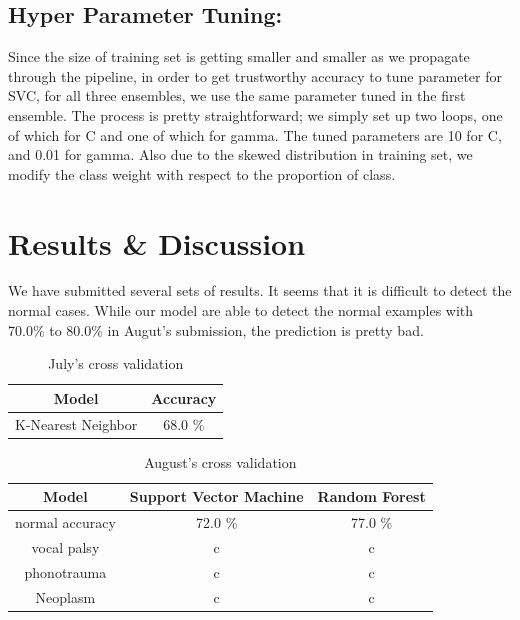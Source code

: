 \documentclass[conference]{IEEEtran}
\begin{document}
	\subsection{Hyper Parameter Tuning:}
		Since the size of training set is getting smaller and smaller as we propagate through the pipeline, in order to get trustworthy accuracy to tune parameter for SVC, for all three ensembles, we use the same parameter tuned in the first ensemble. The process is pretty straightforward; we simply set up two loops, one of which for C and one of which for gamma. The tuned parameters are 10 for C, and 0.01 for gamma. Also due to the skewed distribution in training set, we modify the class weight with respect to the proportion of class. 


\section{Results \& Discussion}

We have submitted several sets of results. It seems that it is difficult to detect the normal cases. While our model are able to detect the normal examples with 70.0\% to 80.0\% in Augut's submission, the prediction is pretty bad. 

\begin{table}[htbp]
	\caption{July's cross validation}
	\begin{center}
		\begin{tabular}{|c|c|}
			\hline
			Model & Accuracy \\
			\hline
			K-Nearest Neighbor & 68.0 \% \\
			\hline
		\end{tabular}
		\label{tab0}
	\end{center}
\end{table}

\begin{table}[htbp]
	\caption{August's cross validation}
	\begin{center}
		\begin{tabular}{|c|c|c|}
			\hline
			Model & Support Vector Machine & Random Forest \\
			\hline
			normal accuracy & 72.0 \% & 77.0 \% \\
			\hline
			vocal palsy & c & c \\
			\hline
			phonotrauma & c & c \\
			\hline
			Neoplasm &c & c\\
			\hline
		\end{tabular}
		\label{tab1}
	\end{center}
\end{table}
\end{document}
